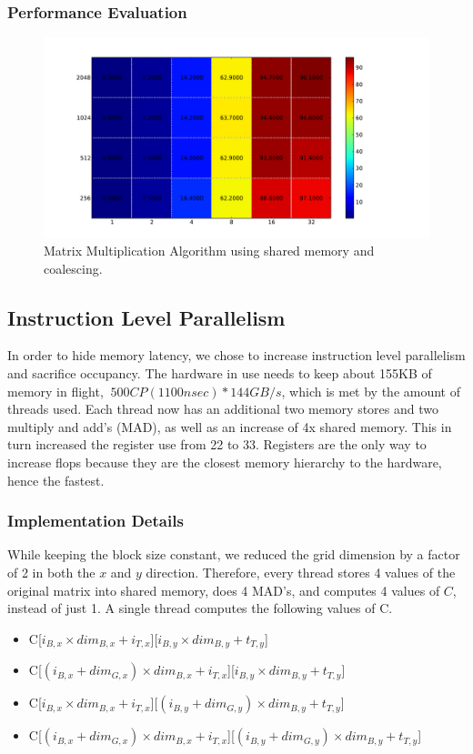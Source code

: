 \documentclass[12pt]{article}
\begin{document}
\subsubsection{Performance Evaluation}
\begin{figure}[H]
\includegraphics[width=\textwidth]{blocked_heat_coalesced_scaled.pdf}
\caption{Matrix Multiplication Algorithm using shared memory and coalescing.}
\label{fig:coa_performance}
\end{figure}

\subsection{Instruction Level Parallelism}
In order to hide memory latency, we chose to increase instruction level parallelism and sacrifice occupancy. The hardware in use needs to keep about 155KB of memory in flight, $~500CP(1100 nsec) * 144 GB/s$, which is met by the amount of threads used. Each thread now has an additional two memory stores and two multiply and add's (MAD), as well as an increase of 4x shared memory. This in turn increased the register use from 22 to 33. Registers are the only way to increase flops because they are the closest memory hierarchy to the hardware, hence the fastest.

\subsubsection{Implementation Details}
While keeping the block size constant, we reduced the grid dimension by a factor of 2 in both the $x$ and $y$ direction. Therefore, every thread stores 4 values of the original matrix into shared memory, does 4 MAD's, and computes 4 values of $C$, instead of just 1. A single thread computes the following values of C.

\begin{itemize}
	\item C[$i_{B,x} \times \mathit{dim}_{B,x} + i_{T,x}$][$i_{B,y} \times \mathit{dim}_{B,y} + t_{T,y}$]
    \item C[$(i_{B,x} + \mathit{dim}_{G,x}) \times \mathit{dim}_{B,x} + i_{T,x}$][$i_{B,y} \times \mathit{dim}_{B,y} + t_{T,y}$]
   	\item C[$i_{B,x} \times \mathit{dim}_{B,x} + i_{T,x}$][$(i_{B,y} + \mathit{dim}_{G,y}) \times \mathit{dim}_{B,y} + t_{T,y}$]
     \item C[$(i_{B,x} + \mathit{dim}_{G,x}) \times \mathit{dim}_{B,x} + i_{T,x}$][$(i_{B,y} + \mathit{dim}_{G,y}) \times \mathit{dim}_{B,y} + t_{T,y}$]
\end{itemize}
\end{document}
